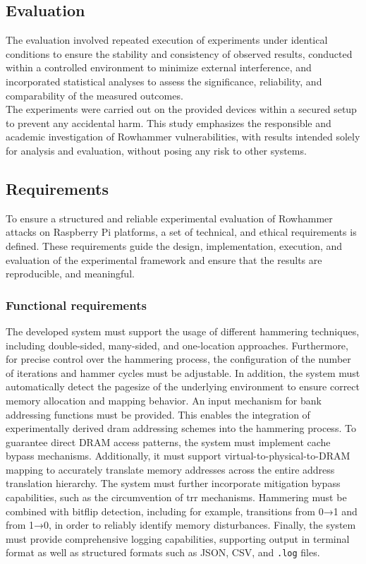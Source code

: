   \subsection{Evaluation} \label{subsec:evaluation}
    The evaluation involved repeated execution of experiments under identical 
    conditions to ensure the stability and consistency of observed results, 
    conducted within a controlled environment to minimize external interference, 
    and incorporated statistical analyses to assess the significance, reliability, 
    and comparability of the measured outcomes.
    \\
    The experiments were carried out on the provided devices within a secured setup 
    to prevent any accidental harm. This study emphasizes the responsible and 
    academic investigation of Rowhammer vulnerabilities, with results intended solely for 
    analysis and evaluation, without posing any risk to other systems.

  \subsection{Requirements} \label{subsec:requirements}
    To ensure a structured and reliable experimental evaluation of Rowhammer attacks on Raspberry Pi platforms, 
    a set of technical, and ethical requirements is defined. These requirements guide the design, 
    implementation, execution, and evaluation of the experimental framework and ensure that the results are 
    reproducible, and meaningful.

    \subsubsection{Functional requirements} \label{subsubsec:functional-requirements}
      The developed system must support the usage of different hammering techniques, including 
      double-sided, many-sided, and one-location approaches. 
      Furthermore, for precise control over the hammering process, the configuration of the 
      number of iterations and hammer cycles must be adjustable. In addition, the system must 
      automatically detect the pagesize of the underlying environment to ensure correct 
      memory allocation and mapping behavior. An input mechanism for bank addressing functions must be 
      provided. This enables the integration of experimentally 
      derived \gls{dram} addressing schemes into the hammering process. 
      To guarantee direct DRAM access patterns, 
      the system must implement cache bypass mechanisms. Additionally, it must support 
      virtual-to-physical-to-DRAM mapping to accurately translate memory addresses 
      across the entire address translation hierarchy. The system must further incorporate mitigation bypass 
      capabilities, such as the circumvention of \gls{trr} mechanisms. 
      Hammering must be combined with bitflip detection, including for example, transitions 
      from 0→1 and from 1→0, in order to reliably identify memory disturbances.
      Finally, the system must provide comprehensive logging capabilities, supporting 
      output in terminal format as well as structured formats such as JSON, CSV, and 
      \texttt{.log} files.  
      
